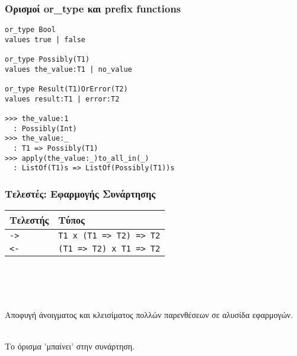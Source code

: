 \documentclass{beamer}
\def\e{\foreignlanguage{english}}
\begin{document}
\begin{frame}[fragile]

\frametitle{Ορισμοί \e{or\_type} και \e{prefix functions}}


\begin{otherlanguage}{english}
\begin{verbatim}
or_type Bool
values true | false

or_type Possibly(T1)
values the_value:T1 | no_value

or_type Result(T1)OrError(T2)
values result:T1 | error:T2

>>> the_value:1
  : Possibly(Int)
>>> the_value:_
  : T1 => Possibly(T1)
>>> apply(the_value:_)to_all_in(_)
  : ListOf(T1)s => ListOf(Possibly(T1))s

\end{verbatim}
\end{otherlanguage}

\end{frame}

\begin{frame}[fragile]

\frametitle{Τελεστές: Εφαρμογής Συνάρτησης}

\begin{center}
\begin{tabular}{ |P{2cm}|P{5cm}| }
 \hline
 Τελεστής & Τύπος
 \\
 \hline
 \e{\texttt{->}} & \e{\texttt{T1 x (T1 => T2) => T2}}
 \\
 \e{\texttt{<-}} & \e{\texttt{(T1 => T2) x T1 => T2}}
 \\
 \hline
\end{tabular}
\\~\
\\~\
\end{center}

Αποφυγή άνοιγματος και κλεισίματος πολλών παρενθέσεων σε αλυσίδα εφαρμογών.
\\~\

Το όρισμα 'μπαίνει' στην συνάρτηση.
\end{frame}
\end{document}
